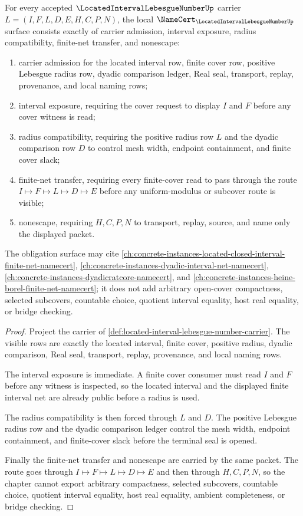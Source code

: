 \begin{theorem}
\label{thm:located-interval-lebesgue-number-namecert-obligations}
For every accepted $\LocatedIntervalLebesgueNumberUp$ carrier $L=(I,F,L,D,E,H,C,P,N)$, the local $\NameCert_{\LocatedIntervalLebesgueNumberUp}$ surface consists exactly of carrier admission, interval exposure, radius compatibility, finite-net transfer, and nonescape:
\begin{enumerate}
\item carrier admission for the located interval row, finite cover row, positive Lebesgue radius row, dyadic comparison ledger, Real seal, transport, replay, provenance, and local naming rows;
\item interval exposure, requiring the cover request to display $I$ and $F$ before any cover witness is read;
\item radius compatibility, requiring the positive radius row $L$ and the dyadic comparison row $D$ to control mesh width, endpoint containment, and finite cover slack;
\item finite-net transfer, requiring every finite-cover read to pass through the route $I \longmapsto F \longmapsto L \longmapsto D \longmapsto E$ before any uniform-modulus or subcover route is visible;
\item nonescape, requiring $H,C,P,N$ to transport, replay, source, and name only the displayed packet.
\end{enumerate}
The obligation surface may cite \autoref{ch:concrete-instances-located-closed-interval-finite-net-namecert}, \autoref{ch:concrete-instances-dyadic-interval-net-namecert}, \autoref{ch:concrete-instances-dyadicratcore-namecert}, and \autoref{ch:concrete-instances-heine-borel-finite-net-namecert}; it does not add arbitrary open-cover compactness, selected subcovers, countable choice, quotient interval equality, host real equality, or bridge checking.
\end{theorem}
\begin{proof}
Project the carrier of \autoref{def:located-interval-lebesgue-number-carrier}. The visible rows are exactly the located interval, finite cover, positive radius, dyadic comparison, Real seal, transport, replay, provenance, and local naming rows.

The interval exposure is immediate. A finite cover consumer must read $I$ and $F$ before any witness is inspected, so the located interval and the displayed finite interval net are already public before a radius is used.

The radius compatibility is then forced through $L$ and $D$. The positive Lebesgue radius row and the dyadic comparison ledger control the mesh width, endpoint containment, and finite-cover slack before the terminal seal is opened.

Finally the finite-net transfer and nonescape are carried by the same packet. The route goes through $I \longmapsto F \longmapsto L \longmapsto D \longmapsto E$ and then through $H,C,P,N$, so the chapter cannot export arbitrary compactness, selected subcovers, countable choice, quotient interval equality, host real equality, ambient completeness, or bridge checking.
\end{proof}

